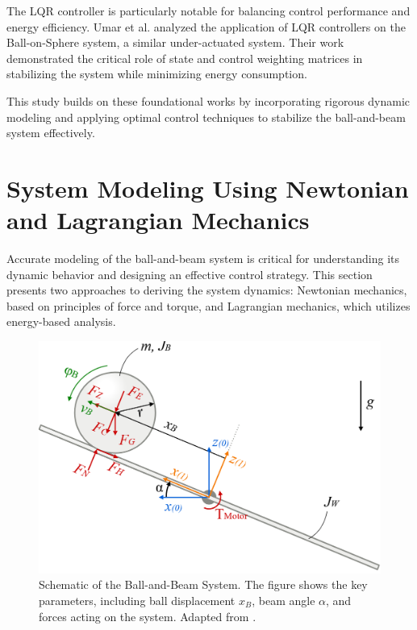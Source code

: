 \documentclass[conference]{IEEEtran}
\begin{document}
The LQR controller is particularly notable for balancing control performance and energy efficiency. Umar et al. \cite{umar2022} analyzed the application of LQR controllers on the Ball-on-Sphere system, a similar under-actuated system. Their work demonstrated the critical role of state and control weighting matrices in stabilizing the system while minimizing energy consumption.

This study builds on these foundational works by incorporating rigorous dynamic modeling and applying optimal control techniques to stabilize the ball-and-beam system effectively.

\section{System Modeling Using Newtonian and Lagrangian Mechanics}
\label{sec:modeling}
Accurate modeling of the ball-and-beam system is critical for understanding its dynamic behavior and designing an effective control strategy. This section presents two approaches to deriving the system dynamics: Newtonian mechanics, based on principles of force and torque, and Lagrangian mechanics, which utilizes energy-based analysis.

\begin{figure}[H]
    \centering
    \includegraphics[width=\linewidth]{Figures/system_diag_wiki_right.PNG}
    \caption{Schematic of the Ball-and-Beam System. The figure shows the key parameters, including ball displacement \(x_B\), beam angle \(\alpha\), and forces acting on the system. Adapted from \cite{mager2015}.}
    \label{fig:ball_beam_schematic}
\end{figure}
\end{document}
